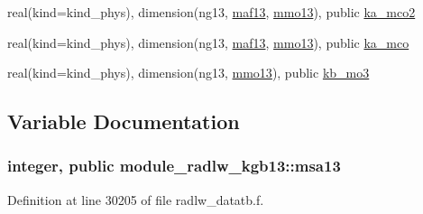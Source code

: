 \begin{DoxyCompactItemize}
real(kind=kind\+\_\+phys), dimension(ng13, \hyperlink{group__module__radlw__main_ga1ddc025df872b12194b8c6344cc0204e}{maf13}, \hyperlink{group__module__radlw__main_gae513ce55829a57a0dbda77f570e4a619}{mmo13}), public \hyperlink{group__module__radlw__main_ga523a0bc861ea861869f59b7bd007ff50}{ka\+\_\+mco2}
\item 
real(kind=kind\+\_\+phys), dimension(ng13, \hyperlink{group__module__radlw__main_ga1ddc025df872b12194b8c6344cc0204e}{maf13}, \hyperlink{group__module__radlw__main_gae513ce55829a57a0dbda77f570e4a619}{mmo13}), public \hyperlink{group__module__radlw__main_ga0c2f5802f9471c35759cb673dbc8ca05}{ka\+\_\+mco}
\item 
real(kind=kind\+\_\+phys), dimension(ng13, \hyperlink{group__module__radlw__main_gae513ce55829a57a0dbda77f570e4a619}{mmo13}), public \hyperlink{group__module__radlw__main_gacc93fbdd9ce1062cbe9b01973d8ab229}{kb\+\_\+mo3}
\end{DoxyCompactItemize}


\subsection{Variable Documentation}
\subsubsection[{\texorpdfstring{msa13}{msa13}}]{\setlength{\rightskip}{0pt plus 5cm}integer, public module\+\_\+radlw\+\_\+kgb13\+::msa13}\hypertarget{namespacemodule__radlw__kgb13_a07932a22e5f8de248765a207e170ce6f}{}\label{namespacemodule__radlw__kgb13_a07932a22e5f8de248765a207e170ce6f}


Definition at line 30205 of file radlw\+\_\+datatb.\+f.

